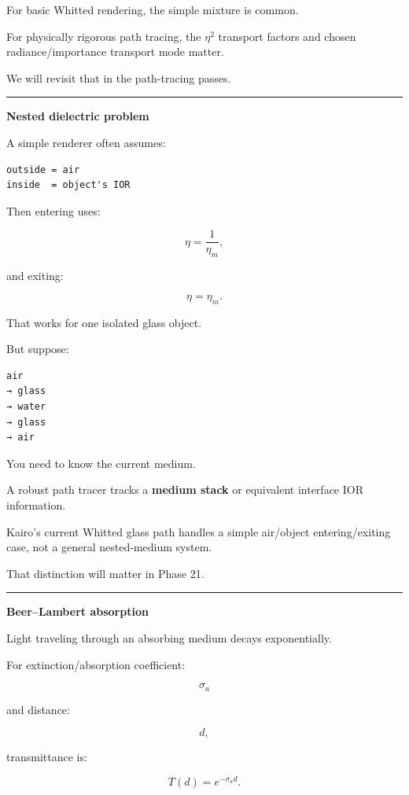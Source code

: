 For basic Whitted rendering, the simple mixture is common.

For physically rigorous path tracing, the \(\eta^2\) transport factors and chosen radiance/importance transport mode matter.

We will revisit that in the path-tracing passes.

\begin{center}\rule{0.5\linewidth}{0.5pt}\end{center}

\textbf{Nested dielectric problem}

A simple renderer often assumes:

\begin{verbatim}
outside = air
inside  = object's IOR
\end{verbatim}

Then entering uses:

\[
\eta=
\frac1{\eta_m},
\]

and exiting:

\[
\eta=
\eta_m.
\]

That works for one isolated glass object.

But suppose:

\begin{verbatim}
air
→ glass
→ water
→ glass
→ air
\end{verbatim}

You need to know the current medium.

A robust path tracer tracks a \textbf{medium stack} or equivalent interface IOR information.

Kairo's current Whitted glass path handles a simple air/object entering/exiting case, not a general nested-medium system.

That distinction will matter in Phase 21.

\begin{center}\rule{0.5\linewidth}{0.5pt}\end{center}

\textbf{Beer--Lambert absorption}

Light traveling through an absorbing medium decays exponentially.

For extinction/absorption coefficient:

\[
\sigma_a
\]

and distance:

\[
d,
\]

transmittance is:

\[
\boxed{
T(d)=e^{-\sigma_a d}.
}
\]

